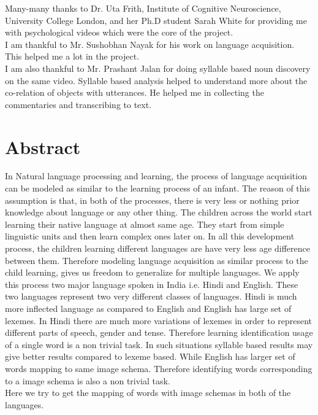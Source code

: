 \def\DevnagVersion{2.15}\documentclass[a4paper, 11pt, notitlepage]{report}
\begin{document}
\hspace*{10pt} Many-many thanks to Dr. Uta Frith, Institute of Cognitive Neuroscience, University College London, and  her Ph.D student Sarah White for providing me with psychological videos which were the core of the project.\\

\hspace*{10pt} I am thankful to Mr. Sushobhan Nayak for his work on language acquisition. This helped me a lot in the project.\\

\hspace*{10pt} I am also thankful to Mr. Prashant Jalan for doing syllable based noun discovery on the same video. Syllable based analysis helped to understand more about the co-relation of objects with utterances. He helped me in collecting the commentaries and transcribing to text.

\tableofcontents 

\newpage
\hspace*{10pt} \section*{Abstract}

In Natural language processing and learning, the process of language acquisition can be modeled as similar to the learning process of an infant.  The reason of this assumption is that, in both of the processes, there is very less or nothing prior knowledge about language or any other thing. The children across the world start learning their native language at almost same age\cite{EngJapChi}. They start from simple linguistic units and then learn complex ones later on. In all this development process, the children learning different languages are have very less age difference between them.
\hspace*{15pt} Therefore modeling language acquisition as similar process to the child learning, gives us freedom to generalize for multiple languages. We apply this process two major language spoken in India i.e. Hindi and English. These two languages represent two very different classes of languages. Hindi is much more inflected language as compared to English and English has large set of lexemes. In Hindi there are much more variations of lexemes in order to represent different parts of speech, gender and tense. Therefore learning identification usage of a single word is a non trivial task. In such situations syllable based results may give better results compared to lexeme based. While English has larger set of words mapping to same image schema. Therefore identifying words corresponding to a image schema is also a non trivial task.\\
Here we try to get the mapping of words with image schemas in both of the languages.\\
\end{document}
